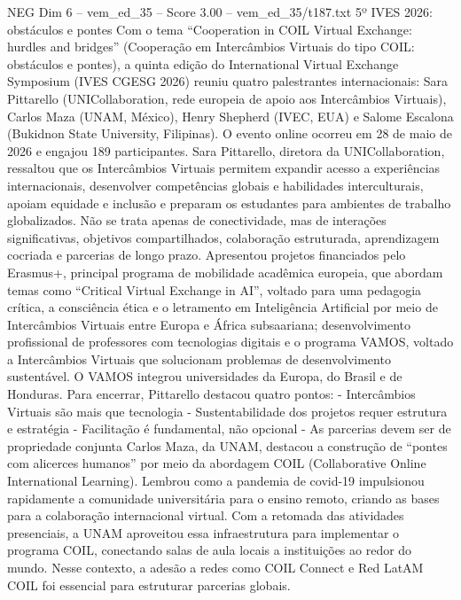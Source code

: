 \begin{textsample}{NEG Dim 6 – vem\_ed\_35 – Score 3.00 – vem\_ed\_35/t187.txt}  \label{ex:f6_neg_010}
5º IVES 2026: obstáculos e pontes Com o tema “Cooperation in COIL Virtual Exchange: hurdles and bridges” (Cooperação em Intercâmbios Virtuais do tipo COIL: obstáculos e pontes), a quinta edição do International Virtual Exchange Symposium (IVES CGESG 2026) reuniu quatro palestrantes internacionais: Sara Pittarello (UNICollaboration, rede europeia de apoio aos Intercâmbios Virtuais), Carlos Maza (UNAM, México), Henry Shepherd (IVEC, EUA) e Salome Escalona (Bukidnon State University, Filipinas).
O evento online ocorreu em 28 de maio de 2026 e engajou 189 participantes.
Sara Pittarello, diretora da UNICollaboration, ressaltou que os Intercâmbios Virtuais permitem expandir acesso a experiências internacionais, desenvolver competências globais e habilidades interculturais, apoiam equidade e inclusão e preparam os estudantes para ambientes de trabalho globalizados.
Não se trata apenas de conectividade, mas de interações significativas, objetivos compartilhados, colaboração estruturada, aprendizagem cocriada e parcerias de longo prazo.
Apresentou projetos financiados pelo Erasmus+, principal programa de mobilidade acadêmica europeia, que abordam temas como “Critical Virtual Exchange in AI”, voltado para uma pedagogia crítica, a consciência ética e o letramento em Inteligência Artificial por meio de Intercâmbios Virtuais entre Europa e África subsaariana; desenvolvimento profissional de professores com tecnologias digitais e o programa VAMOS, voltado a Intercâmbios Virtuais que solucionam problemas de desenvolvimento sustentável.
O VAMOS integrou universidades da Europa, do Brasil e de Honduras.
Para encerrar, Pittarello destacou quatro pontos: - Intercâmbios Virtuais são mais que tecnologia - Sustentabilidade dos projetos requer estrutura e estratégia - Facilitação é fundamental, não opcional - As parcerias devem ser de propriedade conjunta Carlos Maza, da UNAM, destacou a construção de “pontes com alicerces humanos” por meio da abordagem COIL (Collaborative Online International Learning).
Lembrou como a pandemia de covid-19 impulsionou rapidamente a comunidade universitária para o ensino remoto, criando as bases para a colaboração internacional virtual.
Com a retomada das atividades presenciais, a UNAM aproveitou essa infraestrutura para implementar o programa COIL, conectando salas de aula locais a instituições ao redor do mundo.
Nesse contexto, a adesão a redes como COIL Connect e Red LatAM COIL foi essencial para estruturar parcerias globais.

\end{textsample}
